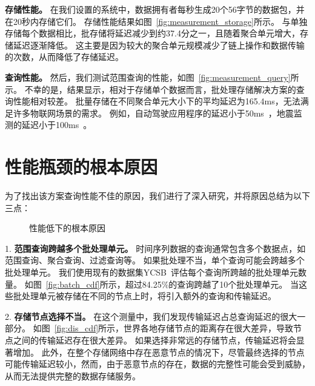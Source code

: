 \textbf{存储性能。}
在我们设置的系统中，数据拥有者每秒生成20个56字节的数据包，并在20秒内存储它们。
存储性能结果如图~\autoref{fig:measurement_storage}所示。
与单独存储每个数据相比，批存储将延迟减少到约37.4分之一，且随着聚合单元增大，存储延迟逐渐降低。
这主要是因为较大的聚合单元规模减少了链上操作和数据传输的次数，从而降低了存储延迟。

\textbf{查询性能。}
然后，我们测试范围查询的性能，如图~\autoref{fig:measurement_query}所示。
不幸的是，结果显示，相对于存储单个数据而言，批处理存储解决方案的查询性能相对较差。
批量存储在不同聚合单元大小下的平均延迟为165.4ms，无法满足许多物联网场景的需求。
例如，自动驾驶应用程序的延迟小于50ms~\cite{caesar2020nuscenes}，地震监测的延迟小于100ms~\cite{bhatia2023artificial}。

\section{性能瓶颈的根本原因}
为了找出该方案查询性能不佳的原因，我们进行了深入研究，并将原因总结为以下三点：

\begin{figure*}[t]
    \centering
    \begin{minipage}{0.9\linewidth}
	    \centering
        \hfill
        \hfill
        \caption{性能低下的根本原因} 
    \end{minipage}
\end{figure*}

1. \textbf{范围查询跨越多个批处理单元。}
时间序列数据的查询通常包含多个数据点，如范围查询、聚合查询、过滤查询等。
如果批处理不当，单个查询可能会跨越多个批处理单元。
我们使用现有的数据集YCSB~\cite{barata2014ycsb}评估每个查询所跨越的批处理单元数量。
如图~\autoref{fig:batch_cdf}所示，超过84.25\%的查询跨越了10个批处理单元。
当这些批处理单元被存储在不同的节点上时，将引入额外的查询和传输延迟。

2. \textbf{存储节点选择不当。}
在这个测量中，我们发现传输延迟占总查询延迟的很大一部分。
如图~\autoref{fig:dis_cdf}所示，世界各地存储节点的距离存在很大差异，导致节点之间的传输延迟存在很大差异。
如果选择非常远的存储节点，传输延迟将会显著增加。
此外，在整个存储网络中存在恶意节点的情况下，尽管最终选择的节点可能传输延迟较小，然而，由于恶意节点的存在，数据的完整性可能会受到威胁，从而无法提供完整的数据存储服务。


